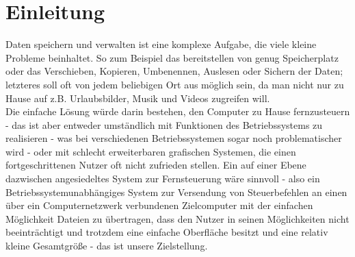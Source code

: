 \documentclass[12pt,a4paper]{scrartcl}
\begin{document}
\section*{Einleitung}
Daten speichern und verwalten ist eine komplexe Aufgabe, die viele kleine Probleme beinhaltet. So zum Beispiel das bereitstellen von genug Speicherplatz oder das Verschieben, Kopieren, Umbenennen, Auslesen oder Sichern der Daten; letzteres soll oft von jedem beliebigen Ort aus möglich sein, da man nicht nur zu Hause auf z.B. Urlaubsbilder, Musik und Videos zugreifen will.\\
Die einfache Lösung würde darin bestehen, den Computer zu Hause fernzusteuern - das ist aber entweder umständlich mit Funktionen des Betriebssystems zu realisieren - was bei verschiedenen Betriebssystemen sogar noch problematischer wird - oder mit schlecht erweiterbaren grafischen Systemen, die einen fortgeschrittenen Nutzer oft nicht zufrieden stellen.
Ein auf einer Ebene dazwischen angesiedeltes System zur Fernsteuerung wäre sinnvoll - also ein Betriebssystemunabhängiges System zur Versendung von Steuerbefehlen an einen über ein Computernetzwerk verbundenen Zielcomputer mit der einfachen Möglichkeit Dateien zu übertragen, dass den Nutzer in seinen Möglichkeiten nicht beeinträchtigt und trotzdem eine einfache Oberfläche besitzt und eine relativ kleine Gesamtgröße - das ist unsere Zielstellung.
\end{document}

